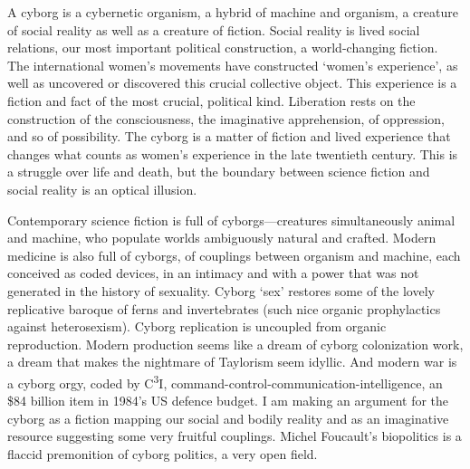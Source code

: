 \documentclass[DIV=12,%
               BCOR=10mm,%
               headinclude=false,%
               footinclude=false,open=any,%
               fontsize=11pt,%
               twoside,%
               paper=210mm:11in]%
               {scrbook}
\begin{document}
A cyborg is a cybernetic organism, a hybrid of machine and organism, a creature of social reality as well as a creature of fiction. Social reality is lived social relations, our most important political construction, a world-changing fiction. The international women’s movements have constructed ‘women’s experience’, as well as uncovered or discovered this crucial collective object. This experience is a fiction and fact of the most crucial, political kind. Liberation rests on the construction of the consciousness, the imaginative apprehension, of oppression, and so of possibility. The cyborg is a matter of fiction and lived experience that changes what counts as women’s experience in the late twentieth century. This is a struggle over life and death, but the boundary between science fiction and social reality is an optical illusion.


Contemporary science fiction is full of cyborgs—creatures simultaneously animal and machine, who populate worlds ambiguously natural and crafted. Modern medicine is also full of cyborgs, of couplings between organism and machine, each conceived as coded devices, in an intimacy and with a power that was not generated in the history of sexuality. Cyborg ‘sex’ restores some of the lovely replicative baroque of ferns and invertebrates (such nice organic prophylactics against heterosexism). Cyborg replication is uncoupled from organic reproduction. Modern production seems like a dream of cyborg colonization work, a dream that makes the nightmare of Taylorism seem idyllic. And modern war is a cyborg orgy, coded by C\textsuperscript{3}I, command-control-communication-intelligence, an \$84 billion item in 1984’s US defence budget. I am making an argument for the cyborg as a fiction mapping our social and bodily reality and as an imaginative resource suggesting some very fruitful couplings. Michel Foucault’s biopolitics is a flaccid premonition of cyborg politics, a very open field.
\end{document}
